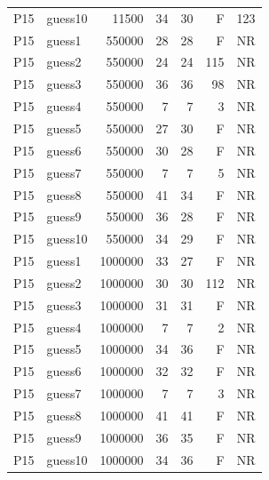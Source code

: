 {\begin{longtable}{llrrrrr}
P15 & guess10 & 11500 & 34 & 30 & F & 123 \\
P15 & guess1 & 550000 & 28 & 28 & F & NR \\
P15 & guess2 & 550000 & 24 & 24 & 115 & NR \\
P15 & guess3 & 550000 & 36 & 36 & 98 & NR \\
P15 & guess4 & 550000 & 7 & 7 & 3 & NR \\
P15 & guess5 & 550000 & 27 & 30 & F & NR \\
P15 & guess6 & 550000 & 30 & 28 & F & NR \\
P15 & guess7 & 550000 & 7 & 7 & 5 & NR \\
P15 & guess8 & 550000 & 41 & 34 & F & NR \\
P15 & guess9 & 550000 & 36 & 28 & F & NR \\
P15 & guess10 & 550000 & 34 & 29 & F & NR \\
P15 & guess1 & 1000000 & 33 & 27 & F & NR \\
P15 & guess2 & 1000000 & 30 & 30 & 112 & NR \\
P15 & guess3 & 1000000 & 31 & 31 & F & NR \\
P15 & guess4 & 1000000 & 7 & 7 & 2 & NR \\
P15 & guess5 & 1000000 & 34 & 36 & F & NR \\
P15 & guess6 & 1000000 & 32 & 32 & F & NR \\
P15 & guess7 & 1000000 & 7 & 7 & 3 & NR \\
P15 & guess8 & 1000000 & 41 & 41 & F & NR \\
P15 & guess9 & 1000000 & 36 & 35 & F & NR \\
P15 & guess10 & 1000000 & 34 & 36 & F & NR \\
\end{longtable}}

